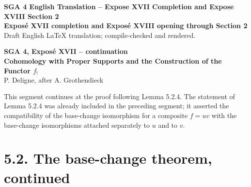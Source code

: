 \documentclass[12pt]{article}
\begin{document}
\begin{center}
{\Large \textbf{SGA 4 English Translation -- Expose XVII Completion and Expose XVIII Section 2}}\\[0.4em]
{\large \textbf{Expos\'e XVII completion and Expos\'e XVIII opening through Section 2}}\\[0.25em]
{\normalsize Draft English LaTeX translation; compile-checked and rendered.}
\end{center}

\bigskip

\begin{center}
{\Large \textbf{SGA 4, Expos\'e XVII -- continuation}}\\[0.35em]
{\large \textbf{Cohomology with Proper Supports and the Construction of the Functor \(f_!\)}}\\[0.25em]
{\normalsize P. Deligne, after A. Grothendieck}
\end{center}

\bigskip

This segment continues at the proof following Lemma 5.2.4. The statement of Lemma 5.2.4 was already included in the preceding segment; it asserted the compatibility of the base-change isomorphism for a composite \(f=uv\) with the base-change isomorphisms attached separately to \(u\) and to \(v\).

\section*{5.2. The base-change theorem, continued}
\end{document}
